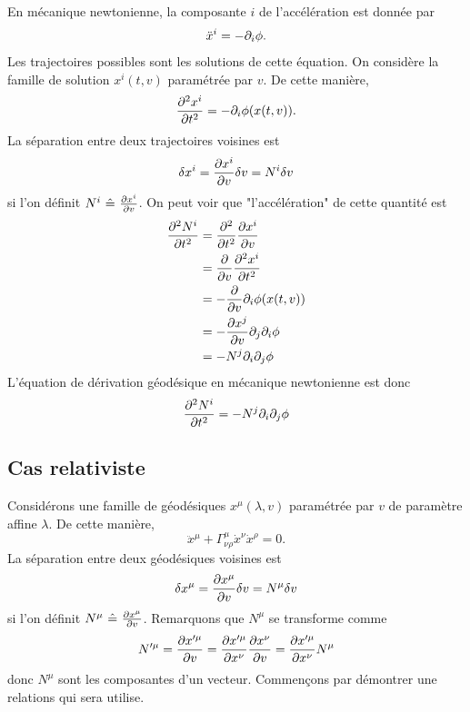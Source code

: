 \documentclass[a4paper,11pt]{report}
\begin{document}
            En mécanique newtonienne, la composante $i$ de l'accélération est donnée par
            \begin{equation}
                \ddot{x}^i = -\partial_i\phi.
            \end{equation}
            Les trajectoires possibles sont les solutions de cette équation. On considère la famille de solution $x^i(t,v)$ paramétrée par $v$. De cette manière,
            \begin{equation}
                \pdv[2]{x^i}{t} = -\partial_i\phi(x(t,v)).
            \end{equation}
            La séparation entre deux trajectoires voisines est
            \begin{equation}
                \delta x^i = \pdv{x^i}{v}\delta v = N^i \delta v
            \end{equation}
            si l'on définit $N^i~\hat{=}~\pdv{x^i}{v}$. On peut voir que "l'accélération" de cette quantité est
            \begin{align}
                \pdv[2]{N^i}{t} &= \pdv[2]{}{t}\pdv{x^i}{v}\\
                &= \pdv{}{v}\pdv[2]{x^i}{t}\\
                &= -\pdv{}{v}\partial_i\phi(x(t,v))\\
                &= -\pdv{x^j}{v}\partial_j\partial_i\phi\\
                &= -N^j\partial_i\partial_j\phi
            \end{align}
            L'équation de dérivation géodésique en mécanique newtonienne est donc
            \begin{equation}
                \pdv[2]{N^i}{t} = -N^j\partial_i\partial_j\phi
            \end{equation}
            
        \subsection{Cas relativiste}
        
            Considérons une famille de géodésiques $x^\mu(\lambda,v)$ paramétrée par $v$ de paramètre affine $\lambda$. De cette manière,
            \begin{equation}
                \ddot{x}^\mu + \Gamma^\mu_{\nu\rho}\dot{x}^\nu\dot{x}^\rho = 0.
            \end{equation}
            La séparation entre deux géodésiques voisines est
            \begin{equation}
                \delta x^\mu = \pdv{x^\mu}{v}\delta v = N^\mu \delta v
            \end{equation}
            si l'on définit $N^\mu~\hat{=}~\pdv{x^\mu}{v}$. Remarquons que $N^\mu$ se transforme comme
            \begin{equation}
                N'^\mu = \pdv{x'^\mu}{v} = \pdv{x'^\mu}{x^\nu}\pdv{x^\nu}{v} = \pdv{x'^\mu}{x^\nu}N^\mu
            \end{equation}
            donc $N^\mu$ sont les composantes d'un vecteur. Commençons par démontrer une relations qui sera utilise.
        
\end{document}
